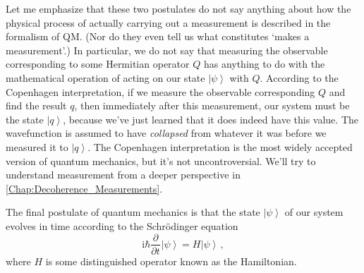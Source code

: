 \documentclass{article}
\theoremstyle{plain}\theoremheaderfont{\normalfont\itshape}\theorembodyfont{\rmfamily}\theoremseparator{.}\newtheorem*{rem}{Remark}\newtheorem*{ex}{Example}\newtheorem*{proof}{Proof}\newtheorem*{altp}{Alternative proof}
\theoremstyle{plain}\theoremheaderfont{\normalfont\bfseries}\theorembodyfont{\rmfamily}\theoremseparator{.}\newtheorem{thm}{Theorem}[section]\newtheorem{lem}[thm]{Lemma}\newtheorem{prop}[thm]{Proposition}\newtheorem*{cor}{Corollary}\newtheorem{defn}[thm]{Definition}\newtheorem{clm}[thm]{Claim}\newtheorem{clminproof}{Claim}
\theoremstyle{break}\theoremheaderfont{\normalfont\itshape}\theorembodyfont{\rmfamily}\theoremseparator{.\medskip}\newtheorem*{proofskip}{Proof}\newtheorem*{exs}{Examples}\newtheorem*{rems}{Remarks}
\theoremstyle{break}\theoremheaderfont{\normalfont\bfseries}\theorembodyfont{\rmfamily}\theoremseparator{.\medskip}\newtheorem{lemskip}[thm]{Lemma}\newtheorem{defnskip}[thm]{Definition}\newtheorem{propskip}[thm]{Proposition}\newtheorem{thmskip}[thm]{Theorem}
\numberwithin{equation}{section}
\newcommand{\ii}{\mathrm{i}}
\newcommand{\pdv}[3][]{\frac{\partial^{#1} #2}{{\partial #3}^{#1}}}
\newcommand{\ket}[1]{\left| #1 \right\rangle}
\begin{document}
    Let me emphasize that these two postulates do not say anything about how the physical process of actually carrying out a measurement is described in the formalism of QM. (Nor do they even tell us what constitutes `makes a measurement'.) In particular, we do not say that measuring the observable corresponding to some Hermitian operator \(Q\) has anything to do with the mathematical operation of acting on our state \(\ket{\psi}\) with \(Q\). According to the Copenhagen interpretation, if we measure the observable corresponding \(Q\) and find the result \(q\), then immediately after this measurement, our system must be the state \(\ket{q}\), because we've just learned that it does indeed have this value. The wavefunction is assumed to have \textit{collapsed} from whatever it was before we measured it to \(\ket{q}\). The Copenhagen interpretation is the most widely accepted version of quantum mechanics, but it's not uncontroversial. We'll try to understand measurement from a deeper perspective in \cref{Chap:Decoherence_Measurements}.

    The final postulate of quantum mechanics is that the state \(\ket{\psi}\) of our system evolves in time according to the Schr\"{o}dinger equation
    \begin{equation}
        \ii\hbar\pdv{}{t}\ket{\psi}=H\ket{\psi}\,,
    \end{equation}
    where \(H\) is some distinguished operator known as the Hamiltonian.
\end{document}
